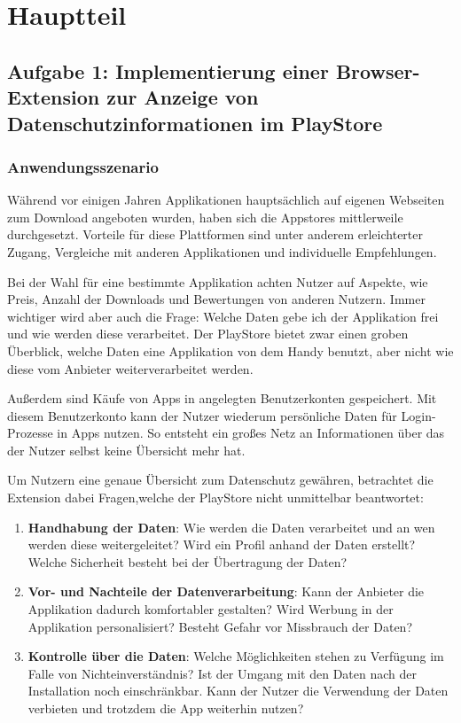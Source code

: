 \chapter{Hauptteil}
\label{c:hauptteil}

\section{Aufgabe 1: Implementierung einer Browser-Extension zur Anzeige von Datenschutzinformationen im PlayStore}
\label{s:implementierungextension}

\subsection{Anwendungsszenario}
\label{ss:anwendungsszenario}


Während vor einigen Jahren Applikationen hauptsächlich auf eigenen Webseiten zum Download angeboten wurden, haben sich die
Appstores mittlerweile durchgesetzt. Vorteile für diese Plattformen sind unter anderem erleichterter Zugang, Vergleiche mit anderen Applikationen und individuelle Empfehlungen.

Bei der Wahl für eine bestimmte Applikation achten Nutzer auf Aspekte, wie Preis, Anzahl der Downloads und Bewertungen von anderen Nutzern. Immer wichtiger wird aber auch die Frage: Welche Daten gebe ich der Applikation frei und wie werden diese verarbeitet. Der PlayStore bietet zwar einen groben Überblick, welche Daten eine Applikation von dem Handy benutzt, aber nicht wie diese vom Anbieter weiterverarbeitet werden.

Außerdem sind Käufe von Apps in angelegten Benutzerkonten gespeichert. Mit diesem Benutzerkonto kann der Nutzer wiederum persönliche Daten für Login-Prozesse in Apps nutzen. So entsteht ein großes Netz an Informationen über das der Nutzer selbst keine Übersicht mehr hat.

Um Nutzern eine genaue Übersicht zum Datenschutz gewähren, betrachtet die Extension dabei Fragen,welche der PlayStore nicht unmittelbar beantwortet:
 \begin{enumerate}
 	\item \textbf{Handhabung der Daten}: Wie werden die Daten verarbeitet und an wen werden diese weitergeleitet? Wird ein Profil anhand der Daten erstellt? Welche Sicherheit besteht bei der Übertragung der Daten?
 	
 	\item \textbf{Vor- und Nachteile der Datenverarbeitung}: Kann der Anbieter die Applikation dadurch komfortabler gestalten? Wird Werbung in der Applikation personalisiert? Besteht Gefahr vor Missbrauch der Daten?
 	
 	\item \textbf{Kontrolle über die Daten}: Welche Möglichkeiten stehen zu Verfügung im Falle von Nichteinverständnis? Ist der Umgang mit den Daten nach der Installation noch einschränkbar. Kann der Nutzer die Verwendung der Daten verbieten und trotzdem die App weiterhin nutzen?
 \end{enumerate}

